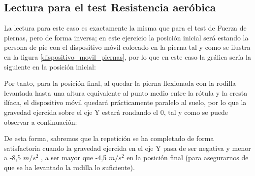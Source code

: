 \subsection{Lectura para el test Resistencia aeróbica}

La lectura para este caso es exactamente la misma que para el test de Fuerza de piernas, pero de forma inversa; en este ejercicio la posición inicial será estando la persona de pie con el dispositivo móvil colocado en la pierna tal y como se ilustra en la figura \ref{dispositivo_movil_piernas}, por lo que en este caso la gráfica sería la siguiente en la posición inicial:


Por tanto, para la posición final, al quedar la pierna flexionada con la rodilla levantada hasta una altura equivalente al punto medio entre la rótula y la cresta ilíaca, el dispositivo móvil quedará prácticamente paralelo al suelo, por lo que la gravedad ejercida sobre el eje Y estará rondando el 0, tal y como se puede observar a continuación:


De esta forma, sabremos que la repetición se ha completado de forma satisfactoria cuando la gravedad ejercida en el eje Y pasa de ser negativa y menor a -8,5 $m/s^{2}$ , a ser mayor que -4,5 $m/s^{2}$ en la posición final (para asegurarnos de que se ha levantado la rodilla lo suficiente).
